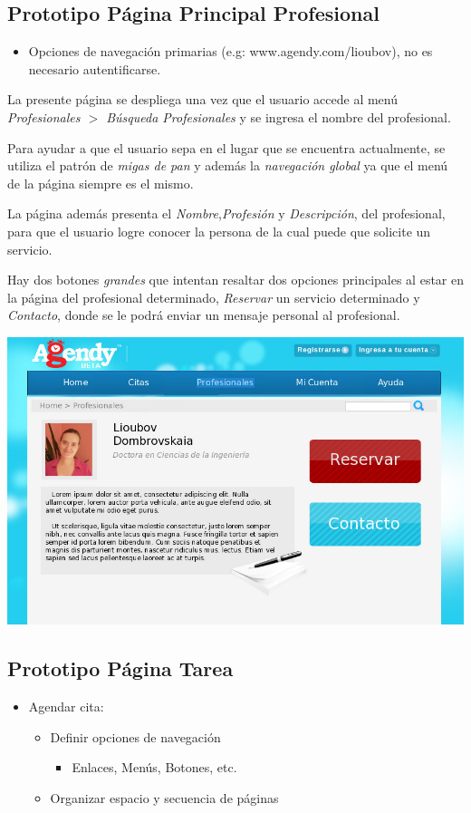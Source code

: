 \documentclass[letter, 10pt]{article}
\begin{document}
\subsection{Prototipo Página Principal Profesional}
\begin{itemize}
	\item Opciones de navegación primarias (e.g: www.agendy.com/lioubov), no es necesario autentificarse.
\end{itemize}

La presente página se despliega una vez que el usuario accede al menú \emph{Profesionales $>$ Búsqueda Profesionales}
y se ingresa el nombre del profesional.

Para ayudar a que el usuario sepa en el lugar que se encuentra actualmente,
se utiliza el patrón de \emph{migas de pan} y además la \emph{navegación global} ya que el menú de la página siempre es el mismo.

La página además presenta el \emph{Nombre},\emph{Profesión} y \emph{Descripción}, del profesional,
para que el usuario logre conocer la persona de la cual puede que solicite un servicio.

Hay dos botones \emph{grandes} que intentan resaltar dos opciones principales al estar en la página del profesional
determinado, \emph{Reservar} un servicio determinado y \emph{Contacto}, donde se le podrá enviar un mensaje personal
al profesional.


\begin{center}
	\includegraphics[width=18cm]{images/2}
\end{center}

%
%
\subsection{Prototipo Página Tarea}
\begin{itemize}
	\item Agendar cita:
	\begin{itemize}
		\item Definir opciones de navegación
		\begin{itemize}
			\item Enlaces, Menús, Botones, etc.
		\end{itemize}
		\item Organizar espacio y secuencia de páginas
	\end{itemize}
\end{itemize}
\end{document}
